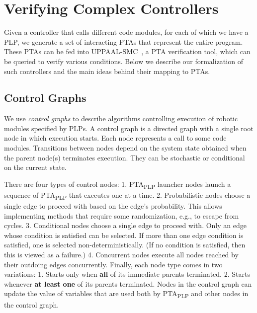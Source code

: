 \documentclass[letterpaper]{article}
\newcommand\rNote[1]{\todo[inline, author=Ronen, color=yellow]{#1}}
\newcommand\aNote[1]{\todo[inline, author=Alex, color=GreenYellow]{#1}}
\begin{document}

\section{Verifying Complex Controllers}
Given a controller that calls different code modules, for each of which we have a PLP, we generate a set of interacting PTAs that represent the entire program. These PTAs can be fed into UPPAAL-SMC~\cite{UPPAAL-SMC}, a PTA verification tool, which can be queried to verify various conditions. Below we describe our formalization of such controllers and the main ideas behind their mapping to PTAs.
\subsection{Control Graphs}
\label{S:control}
We use {\em control graphs} to describe   algorithms controlling execution of robotic modules specified by PLPs.
%
A control graph is a directed graph with a single root node in which execution starts. Each node
represents a call to some code modules. Transitions between nodes depend on the system state obtained when the parent node(s) terminates execution. They can be stochastic or conditional on the current state.

There are four types of control nodes: 1. PTA\textsubscript{PLP} launcher nodes launch a sequence of PTA\textsubscript{PLP} that executes one at a time. 2. Probabilistic nodes choose a single edge to proceed with based on the edge's probability. This allows implementing methods that require some randomization, e.g., to escape from cycles.
3. Conditional nodes choose a single edge to proceed with. Only an edge whose condition is satisfied can be selected. If more than one edge condition is satisfied, one is selected non-deterministically.
(If no condition is satisfied, then this is viewed as a failure.)
4. Concurrent nodes execute all nodes reached by their outdoing edges concurrently.
Finally, each node type comes in two variations: 1. Starts only when \textbf{all} of its immediate parents terminated. 2. Starts whenever \textbf{at least one} of its parents terminated. Nodes in the control graph can update the value of variables that are used both by PTA\textsubscript{PLP} and other nodes in the control graph.
\end{document}
